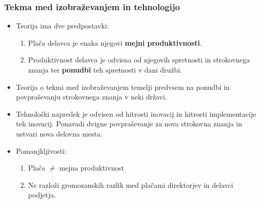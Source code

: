 \documentclass[10pt]{beamer}
\begin{document}
\begin{frame}
\frametitle{Tekma med izobraževanjem in tehnologijo}
\begin{itemize}
\item Teorija ima dve predpostavki:
\begin{enumerate}
\item Plača delavca je enaka njegovi \textbf{mejni produktivnosti}.
\item Produktivnost delavca je odvisna od njegovih spretnosti in strokovnega znanja ter \textbf{ponudbi} teh spretnosti v dani družbi.
\end{enumerate}


\item Teorija o tekmi med izobraževanjem temelji predvsem na ponudbi in povpraševanju strokovnega znanja v neki državi. 
\item Tehnološki napredek je odvisen od hitrosti inovacij in hitrosti implementacije teh inovacij. Ponavadi dvigne povpraševanje za nova strokovna znanja in ustvari nova delovna mesta.


\item Pomanjkljivosti:
\begin{enumerate}
\item Plača $\neq$ mejna produktivnost
\item Ne razloži gromozanskih razlik med plačami direktorjev in delavci podjetja.
\end{enumerate}
\end{itemize}
\end{frame}
\end{document}
